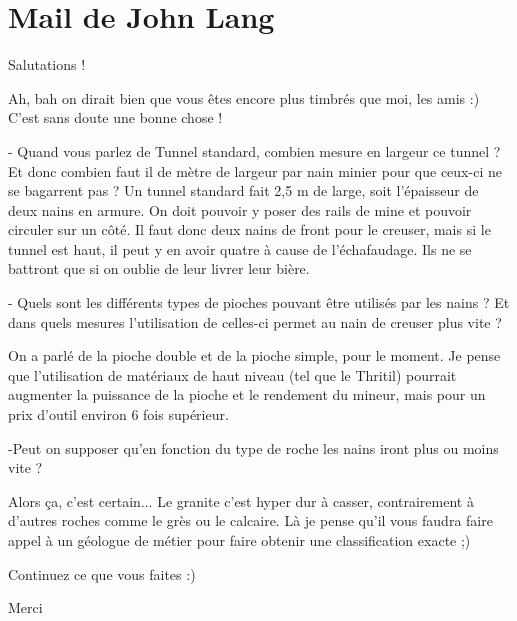 \documentclass[a4paper,10pt]{report}
\begin{document}
\appendix
\chapter{Mail de John Lang}
Salutations !

Ah, bah on dirait bien que vous êtes encore plus timbrés que moi, les amis :)
C'est sans doute une bonne chose !\newline


- Quand vous parlez de Tunnel standard, combien mesure en largeur ce tunnel ? Et donc combien faut il de mètre de largeur par nain minier pour que ceux-ci ne se bagarrent pas ? 
\newline
Un tunnel standard fait 2,5 m de large, soit l'épaisseur de deux nains en armure. On doit pouvoir y poser des rails de mine et pouvoir circuler sur un côté. Il faut donc deux nains de front pour le creuser, mais si le tunnel est haut, il peut y en avoir quatre à cause de l'échafaudage. Ils ne se battront que si on oublie de leur livrer leur bière.
\newline

- Quels sont les différents types de pioches pouvant être utilisés par les nains ? Et dans quels mesures l'utilisation de celles-ci permet au nain de creuser plus vite ? 
\newline

On a parlé de la pioche double et de la pioche simple, pour le moment. Je pense que l'utilisation de matériaux de haut niveau (tel que le Thritil) pourrait augmenter la puissance de la pioche et le rendement du mineur, mais pour un prix d'outil environ 6 fois supérieur.
\newline

-Peut on supposer qu'en fonction du type de roche les nains iront plus ou moins vite ? \newline

Alors ça, c'est certain... Le granite c'est hyper dur à casser, contrairement à d'autres roches comme le grès ou le calcaire. Là je pense qu'il vous faudra faire appel à un géologue de métier pour faire obtenir une classification exacte ;)

Continuez ce que vous faites :)

Merci


  
\end{document}
